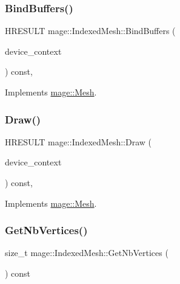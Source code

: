 \subsubsection{\texorpdfstring{Bind\+Buffers()}{BindBuffers()}}
{\footnotesize\ttfamily H\+R\+E\+S\+U\+LT mage\+::\+Indexed\+Mesh\+::\+Bind\+Buffers (\begin{DoxyParamCaption}\item[{I\+D3\+D11\+Device\+Context2 $\ast$}]{device\+\_\+context }\end{DoxyParamCaption}) const\hspace{0.3cm}{\ttfamily [override]}, {\ttfamily [virtual]}}



Implements \hyperlink{classmage_1_1_mesh_adb7cecd184c021c6184b6444adeb5190}{mage\+::\+Mesh}.

\hypertarget{classmage_1_1_indexed_mesh_a6d8543f09c82b4d7e85c68daf39945ce}{}\label{classmage_1_1_indexed_mesh_a6d8543f09c82b4d7e85c68daf39945ce} 
\subsubsection{\texorpdfstring{Draw()}{Draw()}}
{\footnotesize\ttfamily H\+R\+E\+S\+U\+LT mage\+::\+Indexed\+Mesh\+::\+Draw (\begin{DoxyParamCaption}\item[{I\+D3\+D11\+Device\+Context2 $\ast$}]{device\+\_\+context }\end{DoxyParamCaption}) const\hspace{0.3cm}{\ttfamily [override]}, {\ttfamily [virtual]}}



Implements \hyperlink{classmage_1_1_mesh_a8ebd5d1a5159ebeda44e3fb6b98a115c}{mage\+::\+Mesh}.

\hypertarget{classmage_1_1_indexed_mesh_ace923913f29e49a571c32b3fb76f6474}{}\label{classmage_1_1_indexed_mesh_ace923913f29e49a571c32b3fb76f6474} 
\subsubsection{\texorpdfstring{Get\+Nb\+Vertices()}{GetNbVertices()}}
{\footnotesize\ttfamily size\+\_\+t mage\+::\+Indexed\+Mesh\+::\+Get\+Nb\+Vertices (\begin{DoxyParamCaption}{ }\end{DoxyParamCaption}) const}

